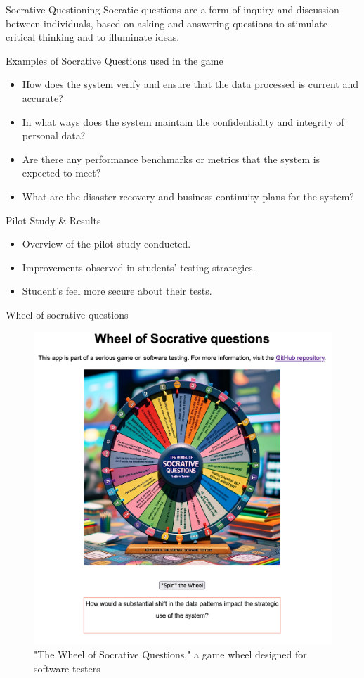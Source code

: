 \documentclass[aspectratio=169]{beamer}
\begin{document}
\begin{frame}{Socrative Questioning}
    Socratic questions are a form of inquiry and discussion between individuals, based on asking and answering questions to stimulate critical thinking and to illuminate ideas.
\end{frame}

\begin{frame}{Examples of Socrative Questions used in the game}
    \begin{itemize}
        \item How does the system verify and ensure that the data processed is current and accurate?
        \item In what ways does the system maintain the confidentiality and integrity of personal data?
        \item Are there any performance benchmarks or metrics that the system is expected to meet?
        \item What are the disaster recovery and business continuity plans for the system?
    \end{itemize}
\end{frame}

\begin{frame}{Pilot Study \& Results}
    \begin{itemize}
        \item Overview of the pilot study conducted.
        \item Improvements observed in students' testing strategies.
        \item Student's feel more secure about their tests.
    \end{itemize}
\end{frame}

\begin{frame}{Wheel of socrative questions}
\begin{figure}
    \centering
    \includegraphics[width=0.5\linewidth]{images//wheel}
    \caption{"The Wheel of Socrative Questions," a game wheel designed for software testers}
\end{figure}
\end{frame}
\end{document}
